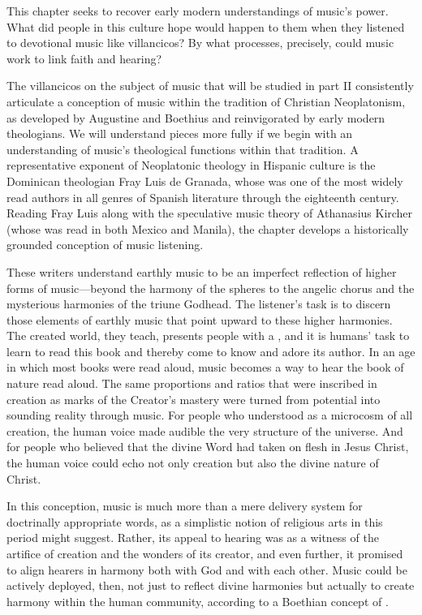 \documentclass{vcbook-proposal}
\begin{document}
This chapter seeks to recover early modern understandings of music's power.
What did people in this culture hope would happen to them when they listened to devotional music like villancicos?
By what processes, precisely, could music work to link faith and hearing?

The villancicos on the subject of music that will be studied in part II consistently articulate a conception of music within the tradition of Christian Neoplatonism, as developed by Augustine and Boethius and reinvigorated by early modern theologians.
We will understand pieces more fully if we begin with an understanding of music's theological functions within that tradition.
A representative exponent of Neoplatonic theology in Hispanic culture is the Dominican theologian Fray Luis de Granada, whose was one of the most widely read authors in all genres of Spanish literature through the eighteenth century.%
  \autocite{LuisdeGranada:Simbolo}
Reading Fray Luis along with the speculative music theory of Athanasius Kircher (whose  was read in both Mexico and Manila), the chapter develops a historically grounded conception of music listening.

These writers understand earthly music to be an imperfect reflection of higher forms of music---beyond the harmony of the spheres to the angelic chorus and the mysterious harmonies of the triune Godhead. 
The listener's task is to discern those elements of earthly music that point upward to these higher harmonies.
The created world, they teach, presents people with a , and it is humans' task to learn to read this book and thereby come to know and adore its author.
In an age in which most books were read aloud, music becomes a way to hear the book of nature read aloud.
The same proportions and ratios that were inscribed in creation as marks of the Creator's mastery were turned from potential into sounding reality through music. 
For people who understood  as a microcosm of all creation, the human voice made audible the very structure of the universe.
And for people who believed that the divine Word had taken on flesh in Jesus Christ, the human voice could echo not only creation but also the divine nature of Christ.

In this conception, music is much more than a mere delivery system for doctrinally appropriate words, as a simplistic notion of religious arts in this period might suggest.
Rather, its appeal to hearing was as a witness of the artifice of creation and the wonders of its creator, and even further, it promised to align hearers in harmony both with God and with each other.
Music could be actively deployed, then, not just to reflect divine harmonies but actually to create harmony within the human community, according to a Boethian concept of .
\end{document}
